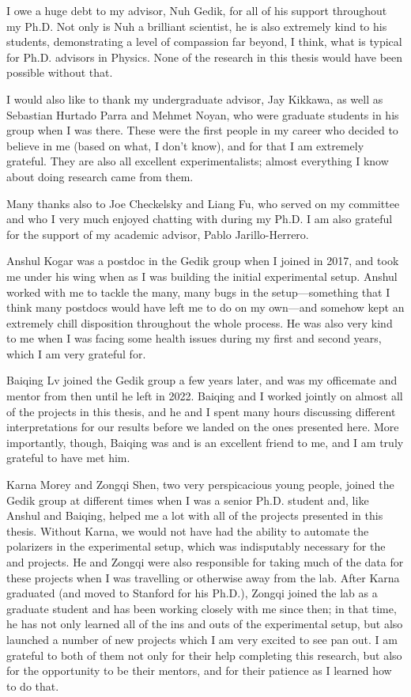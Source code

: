 I owe a huge debt to my advisor, Nuh Gedik, for all of his support throughout my Ph.D.
Not only is Nuh a brilliant scientist, he is also extremely kind to his students, demonstrating a level of compassion far beyond, I think, what is typical for Ph.D. advisors in Physics.
None of the research in this thesis would have been possible without that.

I would also like to thank my undergraduate advisor, Jay Kikkawa, as well as Sebastian Hurtado Parra and Mehmet Noyan, who were graduate students in his group when I was there.
These were the first people in my career who decided to believe in me (based on what, I don't know), and for that I am extremely grateful.
They are also all excellent experimentalists; almost everything I know about doing research came from them.

Many thanks also to Joe Checkelsky and Liang Fu, who served on my committee and who I very much enjoyed chatting with during my Ph.D.
I am also grateful for the support of my academic advisor, Pablo Jarillo-Herrero.

Anshul Kogar was a postdoc in the Gedik group when I joined in \num{2017}, and took me under his wing when as I was building the initial experimental setup.
Anshul worked with me to tackle the many, many bugs in the setup---something that I think many postdocs would have left me to do on my own---and somehow kept an extremely chill disposition throughout the whole process.
He was also very kind to me when I was facing some health issues during my first and second years, which I am very grateful for.

Baiqing Lv joined the Gedik group a few years later, and was my officemate and mentor from then until he left in \num{2022}.
Baiqing and I worked jointly on almost all of the projects in this thesis, and he and I spent many hours discussing different interpretations for our results before we landed on the ones presented here.
More importantly, though, Baiqing was and is an excellent friend to me, and I am truly grateful to have met him.

Karna Morey and Zongqi Shen, two very perspicacious young people, joined the Gedik group at different times when I was a senior Ph.D. student and, like Anshul and Baiqing, helped me a lot with all of the projects presented in this thesis.
Without Karna, we would not have had the ability to automate the polarizers in the experimental setup, which was indisputably necessary for the  and  projects.
He and Zongqi were also responsible for taking much of the data for these projects when I was travelling or otherwise away from the lab.
After Karna graduated (and moved to Stanford for his Ph.D.), Zongqi joined the lab as a graduate student and has been working closely with me since then; in that time, he has not only learned all of the ins and outs of the experimental setup, but also launched a number of new projects which I am very excited to see pan out.
I am grateful to both of them not only for their help completing this research, but also for the opportunity to be their mentors, and for their patience as I learned how to do that.

